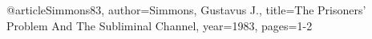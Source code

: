 \documentclass[english,version-2020-11]{uzl-thesis}
\begin{document}
%

\begin{bibtex-entries}
@article{Simmons83,
   author={Simmons, Gustavus J.},
   title={The Prisoners' Problem And The Subliminal Channel},
   year=1983,
   pages={1-2}
}
\end{bibtex-entries}



%
%
%
%
\end{document}
